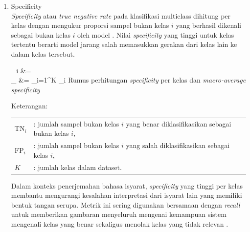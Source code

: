 \begin{enumerate}
	\vspace{0.5cm}
	Sebagai rata-rata harmonik, F1-score memberikan penalti besar terhadap perbedaan ekstrem antara \textit{precision} dan \textit{recall}. Dalam pengenalan bahasa isyarat, nilai F1 yang tinggi pada semua kelas menunjukkan bahwa model mampu mengenali beragam isyarat secara konsisten tanpa bias terhadap kelas tertentu. Oleh karena itu, \textit{macro F1-score} sering dijadikan indikator utama kinerja sistem klasifikasi multiclass bahasa isyarat \cite{Raschka2020}.\par

	\item Specificity \\
	\textit{Specificity} atau \textit{true negative rate} pada klasifikasi multiclass dihitung per kelas dengan mengukur proporsi sampel bukan kelas $i$ yang berhasil dikenali sebagai bukan kelas $i$ oleh model \cite{Raschka2020}. Nilai \textit{specificity} yang tinggi untuk kelas tertentu berarti model jarang salah memasukkan gerakan dari kelas lain ke dalam kelas tersebut.\par

	\vspace{0.5cm}
	\begin{equationcaptioned}[eq:2.specificity]{
		_i &=  \\
		_{} &= \sum_{i=1}^{K} _i
	}{
		Rumus perhitungan \textit{specificity} per kelas dan \textit{macro-average specificity}
	}\end{equationcaptioned}
	\vspace{0.5cm}

	\noindent Keterangan:

\begingroup
	\footnotesize
\begin{tabular}{@{}ll}
	$\mathrm{TN}_i$ & : jumlah sampel bukan kelas $i$ yang benar diklasifikasikan sebagai bukan kelas $i$, \\
	$\mathrm{FP}_i$ & : jumlah sampel bukan kelas $i$ yang salah diklasifikasikan sebagai kelas $i$, \\
	$K$ & : jumlah kelas dalam dataset. \\
	\end{tabular}
	\endgroup

	\vspace{0.5cm}
	Dalam konteks penerjemahan bahasa isyarat, \textit{specificity} yang tinggi per kelas membantu mengurangi kesalahan interpretasi dari isyarat lain yang memiliki bentuk tangan serupa. Metrik ini sering digunakan bersamaan dengan \textit{recall} untuk memberikan gambaran menyeluruh mengenai kemampuan sistem mengenali kelas yang benar sekaligus menolak kelas yang tidak relevan \cite{Raschka2020}.\par

\end{enumerate}
 

